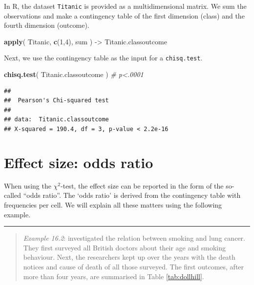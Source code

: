 \documentclass[
]{book}
\newenvironment{Shaded}{\begin{snugshade}}{\end{snugshade}}
\newcommand{\CommentTok}[1]{\textcolor[rgb]{0.56,0.35,0.01}{\textit{#1}}}
\newcommand{\DecValTok}[1]{\textcolor[rgb]{0.00,0.00,0.81}{#1}}
\newcommand{\KeywordTok}[1]{\textcolor[rgb]{0.13,0.29,0.53}{\textbf{#1}}}
\newcommand{\NormalTok}[1]{#1}
\newcommand{\StringTok}[1]{\textcolor[rgb]{0.31,0.60,0.02}{#1}}
\begin{document}
In R, the dataset \texttt{Titanic} is provided as a multidimensional matrix. We sum
the observations and make a contingency table of the first dimension (class) and
the fourth dimension (outcome).

\begin{Shaded}
\begin{Highlighting}[]
\KeywordTok{apply}\NormalTok{( Titanic, }\KeywordTok{c}\NormalTok{(}\DecValTok{1}\NormalTok{,}\DecValTok{4}\NormalTok{), sum ) {-}\textgreater{}}\StringTok{ }\NormalTok{Titanic.classoutcome}
\end{Highlighting}
\end{Shaded}

Next, we use the contingency table as the input for a \texttt{chisq.test}.

\begin{Shaded}
\begin{Highlighting}[]
\KeywordTok{chisq.test}\NormalTok{( Titanic.classoutcome )  }\CommentTok{\# p\textless{}.0001}
\end{Highlighting}
\end{Shaded}

\begin{verbatim}
## 
##  Pearson's Chi-squared test
## 
## data:  Titanic.classoutcome
## X-squared = 190.4, df = 3, p-value < 2.2e-16
\end{verbatim}

\hypertarget{effect-size-odds-ratio}{%
\section{Effect size: odds ratio}\label{effect-size-odds-ratio}}

When using the \(\chi^2\)-test, the effect size can be reported in the form
of the so-called ``odds ratio''. The `odds ratio' is derived from the contingency
table with frequencies per cell. We will explain all these matters
using the following example.

\begin{center}\rule{0.5\linewidth}{0.5pt}\end{center}

\begin{quote}
\emph{Example 16.2}:
\citet{DollHill1956} investigated the relation between smoking
and lung cancer. They first surveyed all British doctors about
their age and smoking behaviour. Next, the researchers kept up over the years with
the death notices and cause of death of all those surveyed. The first
outcomes, after more than four years, are summarised in
Table \ref{tab:dollhill}.
\end{quote}
\end{document}
